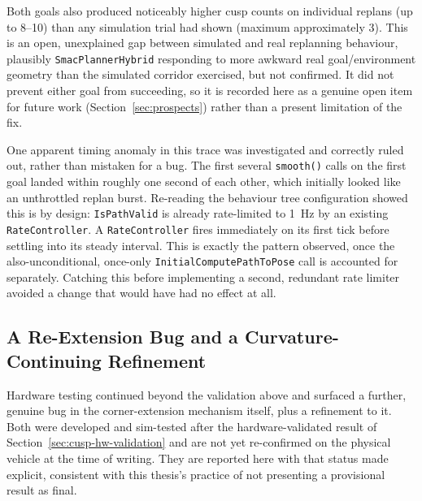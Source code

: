 Both goals also produced noticeably higher cusp counts on individual
replans (up to 8--10) than any simulation trial had shown (maximum
approximately 3). This is an open, unexplained gap between simulated
and real replanning behaviour, plausibly \texttt{SmacPlannerHybrid}
responding to more awkward real goal/environment geometry than the
simulated corridor exercised, but not confirmed. It did not prevent
either goal from succeeding, so it is recorded here as a genuine open
item for future work (Section~\ref{sec:prospects}) rather than a
present limitation of the fix.

One apparent timing anomaly in this trace was investigated and
correctly ruled out, rather than mistaken for a bug. The first
several \texttt{smooth()} calls on the first goal landed within
roughly one second of each other, which initially looked like an
unthrottled replan burst. Re-reading the behaviour tree configuration showed this
is by design: \texttt{IsPathValid} is already rate-limited to
\SI{1}{\hertz} by an existing \texttt{RateController}. A
\texttt{RateController} fires immediately on its first tick before
settling into its steady interval. This is exactly the pattern
observed, once the also-unconditional, once-only
\texttt{InitialComputePathToPose} call is accounted for separately.
Catching this before implementing a
second, redundant rate limiter avoided a change that would have had no
effect at all.

\subsection{A Re-Extension Bug and a Curvature-Continuing Refinement}
\label{sec:cusp-continued-iteration}

Hardware testing continued beyond the validation above and surfaced a
further, genuine bug in the corner-extension mechanism itself, plus a
refinement to it. Both were developed and sim-tested after the
hardware-validated result of Section~\ref{sec:cusp-hw-validation}
and are not yet re-confirmed on the physical vehicle at the time of
writing. They are reported here with that status made explicit,
consistent with this thesis's practice of not presenting a
provisional result as final.

